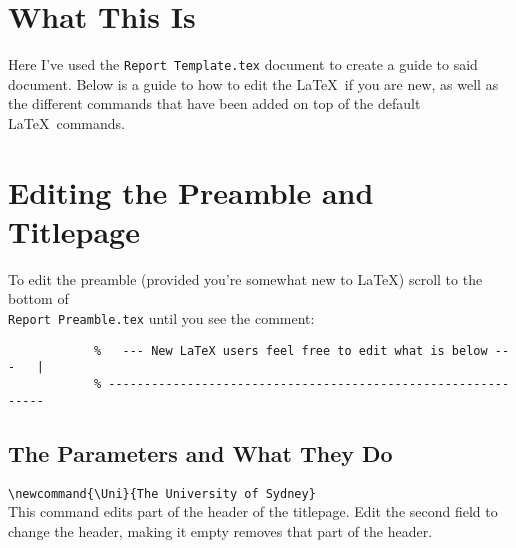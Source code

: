 \documentclass[a4paper, 12pt, english]{article}
\begin{document}

    \fullPageTitle

    \thispagestyle{noheader}
    \tableofcontents



    \newpage

    \section{What This Is}
        \label{sec: what this is}
        
        Here I've used the \verb+Report Template.tex+ document to create a guide to said document. Below is a guide to how to edit the \LaTeX~if you are new, as well as the different commands that have been added on top of the default \LaTeX~commands.
    

    \section{Editing the Preamble and Titlepage}
        \label{sec: editing the preamble}

        To edit the preamble (provided you're somewhat new to \LaTeX) scroll to the bottom of \\\verb+Report Preamble.tex+ until you see the comment:

        \begin{lstlisting}[autogobble]
            % -------------------------------------------------------------
            %   --- New LaTeX users feel free to edit what is below ---   |
            % -------------------------------------------------------------
        \end{lstlisting}



        \subsection{The Parameters and What They Do}
            \label{subsec: the parameters and what they do}

            \verb+\newcommand{\Uni}{The University of Sydney}+\\
            This command edits part of the header of the titlepage. Edit the second field to change the header, making it empty removes that part of the header.
\end{document}
